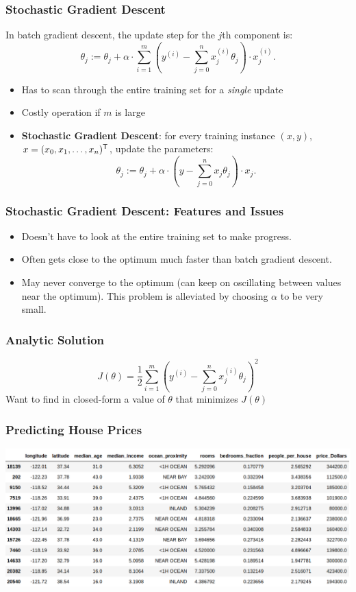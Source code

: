 \documentclass[xcolor=table]{beamer}
\newcommand{\trans}[1]{\ensuremath{#1}^{\footnotesize{\textsf{T}}}}
\begin{document}
\begin{frame}[t]
\frametitle{Stochastic Gradient Descent}
In batch gradient descent, the update step for the $j$th component is:
\[
    \theta_j := \theta_j  + \alpha \cdot \sum_{i = 1}^m 
        \left ( y^{(i)} - \sum_{j = 0}^n x_j^{(i)} \theta_j \right ) \cdot x_j^{(i)}.
\]

\begin{itemize}
    \item Has to scan through the entire training set for a \emph{single} update
    
    \item Costly operation if $m$ is large
    
    \pause

    \item \textbf{Stochastic Gradient Descent}: for every training instance $(x, y)$, 
    $x = \trans{(x_0, x_1, \ldots, x_n)}$, update the parameters:
    \[
         \theta_j := \theta_j  + \alpha \cdot \left ( y - \sum_{j = 0}^n x_j 
         \theta_j \right ) \cdot x_j.
    \]
\end{itemize}
\end{frame}

\begin{frame}[t]
\frametitle{Stochastic Gradient Descent: Features and Issues}
\begin{itemize}
    \item Doesn't have to look at the entire training set to make progress.

    \item Often gets close to the optimum much faster than batch gradient descent.

    \item May never converge to the optimum (can keep on oscillating between values 
    near the optimum). This problem is alleviated by choosing $\alpha$ to be very
    small.
\end{itemize}
\end{frame}

\begin{frame}[t]
\frametitle{Analytic Solution}
\[J(\theta) = 
    \frac{1}{2} \sum_{i = 1}^{m} \left (y^{(i)} - \sum_{j = 0}^{n} x^{(i)}_j \theta_j \right )^2\]  
Want to find in closed-form a value of $\theta$ that minimizes $J(\theta)$ 
\end{frame}

\begin{frame}[t]
\frametitle{Predicting House Prices}
\begin{center}
    \includegraphics[scale=0.2]{housing_data.png}
\end{center}
\end{frame}
\end{document}
